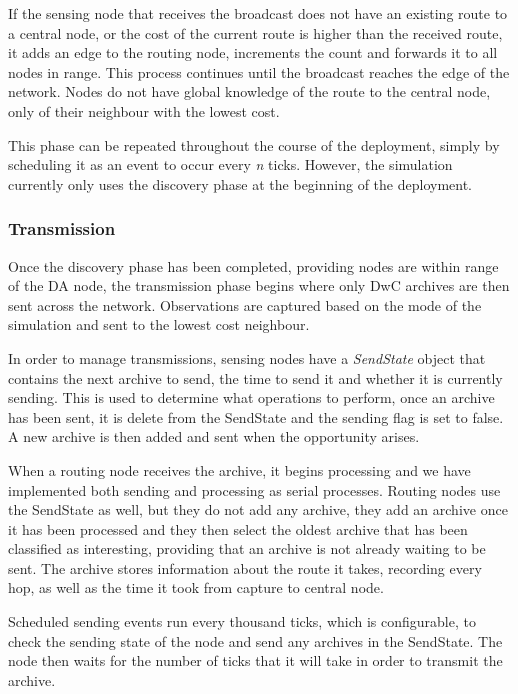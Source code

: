 	If the sensing node that receives the broadcast does not have an existing route to a central node, or the cost of the current route is higher than the received route, it adds an edge to the routing node, increments the count and forwards it to all nodes in range. This process continues until the broadcast reaches the edge of the network. Nodes do not have global knowledge of the route to the central node, only of their neighbour with the lowest cost.
	
	This phase can be repeated throughout the course of the deployment, simply by scheduling it as an event to occur every \textit{n} ticks. However, the simulation currently only uses the discovery phase at the beginning of the deployment.
	
\subsubsection{Transmission}
	Once the discovery phase has been completed, providing nodes are within range of the DA node, the transmission phase begins where only DwC archives are then sent across the network. Observations are captured based on the mode of the simulation and sent to the lowest cost neighbour.
	
	In order to manage transmissions, sensing nodes have a \textit{SendState} object that contains the next archive to send, the time to send it and whether it is currently sending. This is used to determine what operations to perform, once an archive has been sent, it is delete from the SendState and the sending flag is set to false. A new archive is then added and sent when the opportunity arises.
	
	When a routing node receives the archive, it begins processing and we have implemented both sending and processing as serial processes. Routing nodes use the SendState as well, but they do not add any archive, they add an archive once it has been processed and they then select the oldest archive that has been classified as interesting, providing that an archive is not already waiting to be sent. The archive stores information about the route it takes, recording every hop, as well as the time it took from capture to central node.
	
	Scheduled sending events run every thousand ticks, which is configurable, to check the sending state of the node and send any archives in the SendState. The node then waits for the number of ticks that it will take in order to transmit the archive.
	
